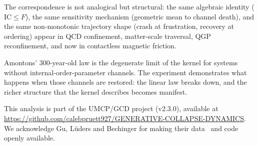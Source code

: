 \documentclass[
  aps,
  prd,
  twocolumn,
  superscriptaddress,
  nofootinbib,
  floatfix
]{revtex4-2}
\newcommand{\IC}{\mathrm{IC}}
\begin{document}
The correspondence is not analogical but structural:
the same algebraic identity ($\IC \leq F$), the
same sensitivity mechanism (geometric mean to channel
death), and the same non-monotonic trajectory shape
(crash at frustration, recovery at ordering) appear
in QCD confinement, matter-scale traversal, QGP
reconfinement, and now in contactless magnetic friction.

Amontons' 300-year-old law is the degenerate limit
of the kernel for systems without internal-order-parameter
channels.  The experiment demonstrates what happens
when those channels are restored: the linear law
breaks down, and the richer structure that the kernel
describes becomes manifest.

\begin{acknowledgments}
This analysis is part of the UMCP/GCD project
(v2.3.0), available at
\url{https://github.com/calebpruett927/GENERATIVE-COLLAPSE-DYNAMICS}.
We acknowledge Gu, L\"uders and Bechinger for making
their data~\cite{gu2026data} and code~\cite{lueders2026code}
openly available.
\end{acknowledgments}


\end{document}
